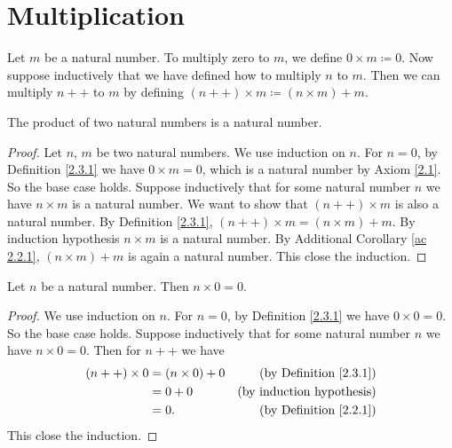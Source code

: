 \section{Multiplication}\label{sec 2.3}

\begin{definition}\label{2.3.1}
Let \(m\) be a natural number.
To multiply zero to \(m\), we define \(0 \times m \coloneqq 0\).
Now suppose inductively that we have defined how to multiply \(n\) to \(m\).
Then we can multiply \(n++\) to \(m\) by defining \((n++) \times m \coloneqq (n \times m) + m\).
\end{definition}

\begin{additional corollary}\label{ac 2.3.1}
The product of two natural numbers is a natural number.
\end{additional corollary}

\begin{proof}
Let \(n\), \(m\) be two natural numbers.
We use induction on \(n\).
For \(n = 0\), by Definition \ref{2.3.1} we have \(0 \times m = 0\), which is a natural number by Axiom \ref{2.1}.
So the base case holds.
Suppose inductively that for some natural number \(n\) we have \(n \times m\) is a natural number.
We want to show that \((n++) \times m\) is also a natural number.
By Definition \ref{2.3.1}, \((n++) \times m = (n \times m) + m\).
By induction hypothesis \(n \times m\) is a natural number.
By Additional Corollary \ref{ac 2.2.1}, \((n \times m) + m\) is again a natural number.
This close the induction.
\end{proof}

\begin{additional corollary}\label{ac 2.3.2}
Let \(n\) be a natural number.
Then \(n \times 0 = 0\).
\end{additional corollary}

\begin{proof}
We use induction on \(n\).
For \(n = 0\), by Definition \ref{2.3.1} we have \(0 \times 0 = 0\).
So the base case holds.
Suppose inductively that for some natural number \(n\) we have \(n \times 0 = 0\).
Then for \(n++\) we have
\begin{align*}
(n++) \times 0 &= (n \times 0) + 0 & \text{(by Definition \ref{2.3.1})} \\
&= 0 + 0 & \text{(by induction hypothesis)} \\
&= 0. & \text{(by Definition \ref{2.2.1})}
\end{align*}
This close the induction.
\end{proof}


